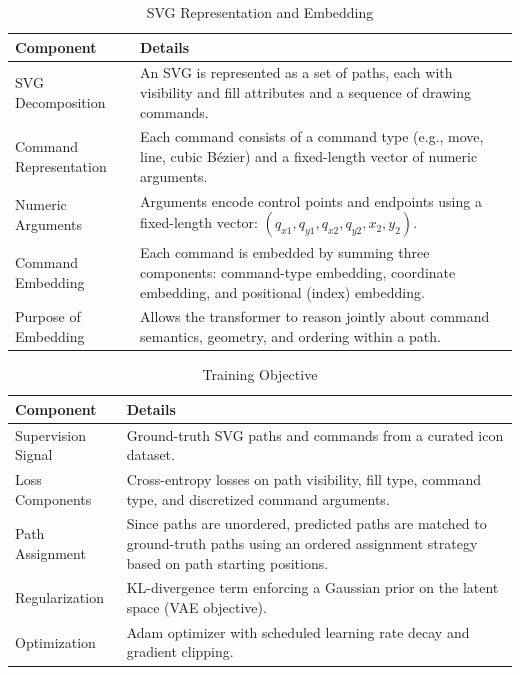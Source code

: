 \begin{table}[h!]
\centering
\caption{SVG Representation and Embedding}
\begin{tabular}{|l|p{10cm}|}
\hline
\textbf{Component} & \textbf{Details} \\ \hline

SVG Decomposition &
An SVG is represented as a set of paths, each with visibility and fill attributes and a sequence of drawing commands. \\ \hline

Command Representation &
Each command consists of a command type (e.g., move, line, cubic Bézier) and a fixed-length vector of numeric arguments. \\ \hline

Numeric Arguments &
Arguments encode control points and endpoints using a fixed-length vector: $(q_{x1}, q_{y1}, q_{x2}, q_{y2}, x_2, y_2)$. \\ \hline

Command Embedding &
Each command is embedded by summing three components: command-type embedding, coordinate embedding, and positional (index) embedding. \\ \hline

Purpose of Embedding &
Allows the transformer to reason jointly about command semantics, geometry, and ordering within a path. \\ \hline

\end{tabular}
\end{table}

\begin{table}[h!]
\centering
\caption{Training Objective}
\begin{tabular}{|l|p{10cm}|}
\hline
\textbf{Component} & \textbf{Details} \\ \hline

Supervision Signal &
Ground-truth SVG paths and commands from a curated icon dataset. \\ \hline

Loss Components &
Cross-entropy losses on path visibility, fill type, command type, and discretized command arguments. \\ \hline

Path Assignment &
Since paths are unordered, predicted paths are matched to ground-truth paths using an ordered assignment strategy based on path starting positions. \\ \hline

Regularization &
KL-divergence term enforcing a Gaussian prior on the latent space (VAE objective). \\ \hline

Optimization &
Adam optimizer with scheduled learning rate decay and gradient clipping. \\ \hline

\end{tabular}
\end{table}

